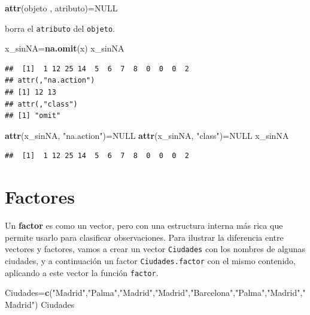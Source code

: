 \documentclass[]{book}
\newenvironment{Shaded}{\begin{snugshade}}{\end{snugshade}}
\newcommand{\KeywordTok}[1]{\textcolor[rgb]{0.13,0.29,0.53}{\textbf{#1}}}
\newcommand{\NormalTok}[1]{#1}
\newcommand{\OtherTok}[1]{\textcolor[rgb]{0.56,0.35,0.01}{#1}}
\newcommand{\StringTok}[1]{\textcolor[rgb]{0.31,0.60,0.02}{#1}}
\theoremstyle{definition}
\theoremstyle{definition}
\theoremstyle{definition}
\theoremstyle{remark}
\begin{document}
\begin{Shaded}
\begin{Highlighting}[]
\KeywordTok{attr}\NormalTok{(objeto , atributo)=}\OtherTok{NULL}
\end{Highlighting}
\end{Shaded}

borra el \texttt{atributo} del \texttt{objeto}.

\begin{Shaded}
\begin{Highlighting}[]
\NormalTok{x_sinNA=}\KeywordTok{na.omit}\NormalTok{(x)}
\NormalTok{x_sinNA}
\end{Highlighting}
\end{Shaded}

\begin{verbatim}
##  [1]  1 12 25 14  5  6  7  8  0  0  0  2
## attr(,"na.action")
## [1] 12 13
## attr(,"class")
## [1] "omit"
\end{verbatim}

\begin{Shaded}
\begin{Highlighting}[]
\KeywordTok{attr}\NormalTok{(x_sinNA, }\StringTok{"na.action"}\NormalTok{)=}\OtherTok{NULL}
\KeywordTok{attr}\NormalTok{(x_sinNA, }\StringTok{"class"}\NormalTok{)=}\OtherTok{NULL}
\NormalTok{x_sinNA}
\end{Highlighting}
\end{Shaded}

\begin{verbatim}
##  [1]  1 12 25 14  5  6  7  8  0  0  0  2
\end{verbatim}

\hypertarget{subsec:factor}{%
\section{Factores}\label{subsec:factor}}

Un \textbf{factor} es como un vector, pero con una estructura interna más rica que permite usarlo para clasificar observaciones. Para ilustrar la diferencia entre vectores y factores, vamos a crear un vector \texttt{Ciudades} con los nombres de algunas ciudades, y a continuación un factor \texttt{Ciudades.factor} con el mismo contenido, aplicando a este vector la función \texttt{factor}.

\begin{Shaded}
\begin{Highlighting}[]
\NormalTok{Ciudades=}\KeywordTok{c}\NormalTok{(}\StringTok{"Madrid"}\NormalTok{,}\StringTok{"Palma"}\NormalTok{,}\StringTok{"Madrid"}\NormalTok{,}\StringTok{"Madrid"}\NormalTok{,}\StringTok{"Barcelona"}\NormalTok{,}\StringTok{"Palma"}\NormalTok{,}\StringTok{"Madrid"}\NormalTok{,}\StringTok{"Madrid"}\NormalTok{)}
\NormalTok{Ciudades}
\end{Highlighting}
\end{Shaded}
\end{document}
